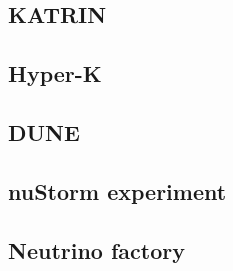 \subsection{KATRIN}
\subsection{Hyper-K}
\subsection{DUNE}
\subsection{nuStorm experiment}
\subsection{Neutrino factory}

